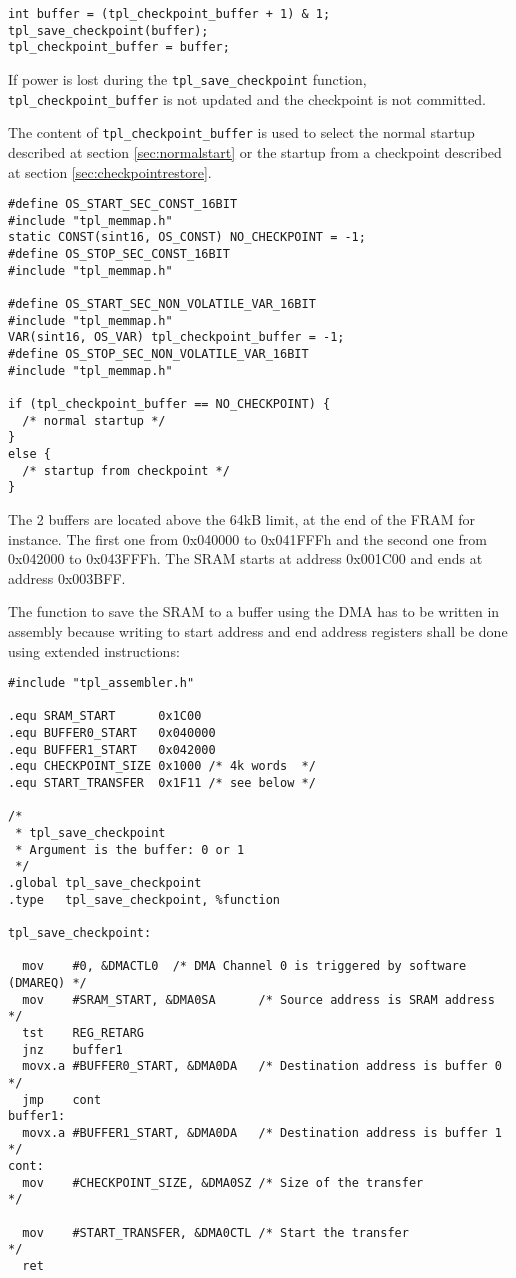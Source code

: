 \documentclass[11pt, oneside]{article}   	%
\begin{document}
\begin{lstlisting}
int buffer = (tpl_checkpoint_buffer + 1) & 1;
tpl_save_checkpoint(buffer);
tpl_checkpoint_buffer = buffer;
\end{lstlisting}

If power is lost during the \lstinline{tpl_save_checkpoint} function, \lstinline{tpl_checkpoint_buffer} is not updated and the checkpoint is not committed. 

The content of \lstinline{tpl_checkpoint_buffer} is used to select the normal startup described at section \ref{sec:normalstart} or the startup from a checkpoint described at section \ref{sec:checkpointrestore}.

\begin{lstlisting}
#define OS_START_SEC_CONST_16BIT
#include "tpl_memmap.h"
static CONST(sint16, OS_CONST) NO_CHECKPOINT = -1;
#define OS_STOP_SEC_CONST_16BIT
#include "tpl_memmap.h"

#define OS_START_SEC_NON_VOLATILE_VAR_16BIT
#include "tpl_memmap.h"
VAR(sint16, OS_VAR) tpl_checkpoint_buffer = -1;
#define OS_STOP_SEC_NON_VOLATILE_VAR_16BIT
#include "tpl_memmap.h"

if (tpl_checkpoint_buffer == NO_CHECKPOINT) {
  /* normal startup */
}
else {
  /* startup from checkpoint */
}
\end{lstlisting}

The 2 buffers are located above the 64kB limit, at the end of the FRAM for instance. The first one from 0x040000 to 0x041FFFh and the second one from 0x042000 to 0x043FFFh.
The SRAM starts at address 0x001C00 and ends at address 0x003BFF.

The function to save the SRAM to a buffer using the DMA has to be written in assembly because writing to start address and end address registers shall be done using extended instructions:

\begin{lstlisting}
#include "tpl_assembler.h"

.equ SRAM_START      0x1C00
.equ BUFFER0_START   0x040000
.equ BUFFER1_START   0x042000
.equ CHECKPOINT_SIZE 0x1000 /* 4k words  */
.equ START_TRANSFER  0x1F11 /* see below */

/*
 * tpl_save_checkpoint
 * Argument is the buffer: 0 or 1
 */
.global tpl_save_checkpoint
.type   tpl_save_checkpoint, %function

tpl_save_checkpoint:

  mov    #0, &DMACTL0  /* DMA Channel 0 is triggered by software (DMAREQ) */
  mov    #SRAM_START, &DMA0SA      /* Source address is SRAM address      */
  tst    REG_RETARG
  jnz    buffer1
  movx.a #BUFFER0_START, &DMA0DA   /* Destination address is buffer 0     */
  jmp    cont
buffer1:
  movx.a #BUFFER1_START, &DMA0DA   /* Destination address is buffer 1     */
cont:
  mov    #CHECKPOINT_SIZE, &DMA0SZ /* Size of the transfer                */
  
  mov    #START_TRANSFER, &DMA0CTL /* Start the transfer                  */
  ret
\end{lstlisting}
\end{document}
